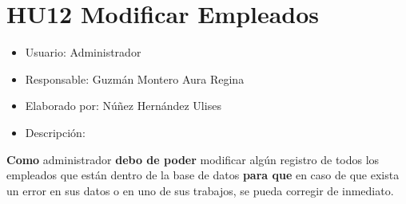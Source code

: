 \section{HU12 Modificar Empleados}
\begin{itemize}
	\item Usuario: Administrador
	\item Responsable: Guzmán Montero Aura Regina
	\item Elaborado por: Núñez Hernández Ulises
	\item Descripción:\\
\end{itemize}

\textbf{Como} administrador \textbf{debo de poder} modificar algún registro de todos los empleados que están dentro de la base de datos \textbf{para que} en caso de que exista un error en sus datos o en uno de sus trabajos, se pueda corregir de inmediato.